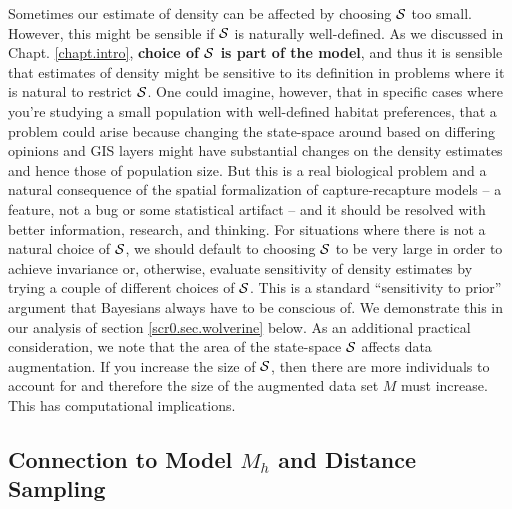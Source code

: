 Sometimes our estimate of density can be affected by choosing ${\cal
  S}$ too small. However, this might be sensible if ${\cal S}$ is
naturally well-defined. As we discussed in Chapt. \ref{chapt.intro},
{\bf choice of ${\cal S}$ is part of the model}, and thus it is
sensible that estimates of density might be sensitive to its
definition in problems where it is natural to restrict ${\cal S}$.
One could imagine, however, that in specific cases where you're
studying a small population with well-defined habitat preferences,
that a problem could arise because changing the state-space around
based on differing opinions and GIS layers might have substantial
changes on the density estimates and hence those of population
size. But this is a real biological problem and a natural consequence
of the spatial formalization of capture-recapture models -- a feature,
not a bug or some statistical artifact -- and it should be resolved
with better information, research, and thinking.  For situations where
there is not a natural choice of ${\cal S}$, we should default to
choosing ${\cal S}$ to be very large in order to achieve invariance
or, otherwise, evaluate sensitivity of density estimates by trying a
couple of different choices of ${\cal S}$. This is a standard
``sensitivity to prior'' argument that Bayesians always have to be
conscious of.  We demonstrate this in our analysis of section
\ref{scr0.sec.wolverine} below. As an additional practical
consideration, we note that the area of the state-space ${\cal S}$
affects data
augmentation. If you increase the size of ${\cal S}$, then there are more
individuals to account for and therefore the size of the augmented
data set $M$ must increase. This has computational implications.

\subsection{Connection to Model $M_h$ and Distance Sampling}
 \label{scr0.sec.scrmh}

